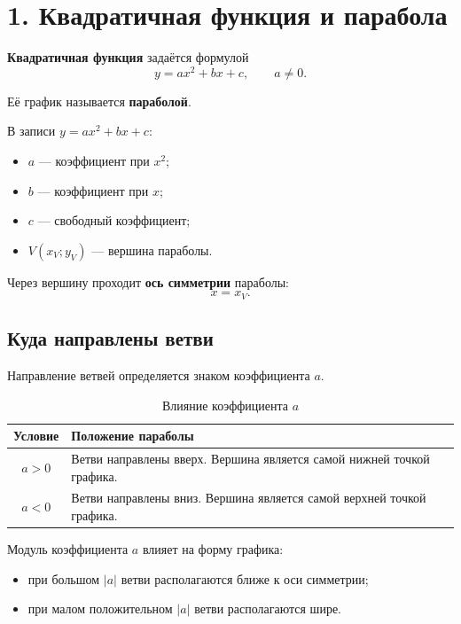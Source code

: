 \documentclass[a4paper,12pt]{article}
\newcommand{\term}[1]{\textcolor{darkaccent}{\textbf{#1}}}
\begin{document}

\section*{1. Квадратичная функция и парабола}

\term{Квадратичная функция} задаётся формулой
\[
  y=ax^2+bx+c,
  \qquad a\ne 0.
\]

Её график называется \term{параболой}.

В записи \(y=ax^2+bx+c\):

\begin{itemize}
  \item \(a\) --- коэффициент при \(x^2\);
  \item \(b\) --- коэффициент при \(x\);
  \item \(c\) --- свободный коэффициент;
  \item \(V(x_V;y_V)\) --- вершина параболы.
\end{itemize}

Через вершину проходит \term{ось симметрии} параболы:
\[
  x=x_V.
\]

\subsection*{Куда направлены ветви}

Направление ветвей определяется знаком коэффициента \(a\).

\begin{table}[ht]
  \centering
  \caption{Влияние коэффициента \(a\)}
  \renewcommand{\arraystretch}{1.35}
  \begin{tabularx}{0.88\linewidth}{@{}cX@{}}
    \toprule
    \textbf{Условие} & \textbf{Положение параболы} \\
    \midrule
    \(a>0\) & Ветви направлены вверх. Вершина является самой нижней точкой графика. \\
    \(a<0\) & Ветви направлены вниз. Вершина является самой верхней точкой графика. \\
    \bottomrule
  \end{tabularx}
\end{table}

Модуль коэффициента \(a\) влияет на форму графика:

\begin{itemize}
  \item при большом \(|a|\) ветви располагаются ближе к оси симметрии;
  \item при малом положительном \(|a|\) ветви располагаются шире.
\end{itemize}
\end{document}
